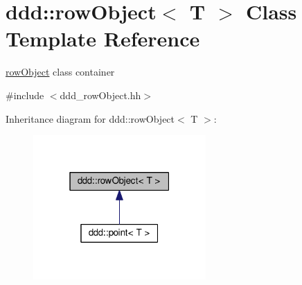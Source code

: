 \hypertarget{classddd_1_1row_object}{}\section{ddd\+:\+:row\+Object$<$ T $>$ Class Template Reference}
\label{classddd_1_1row_object}


\hyperlink{classddd_1_1row_object}{row\+Object} class container  




{\ttfamily \#include $<$ddd\+\_\+row\+Object.\+hh$>$}



Inheritance diagram for ddd\+:\+:row\+Object$<$ T $>$\+:
\nopagebreak
\begin{figure}[H]
\begin{center}
\leavevmode
\includegraphics[width=187pt]{df/da8/classddd_1_1row_object__inherit__graph}
\end{center}
\end{figure}
